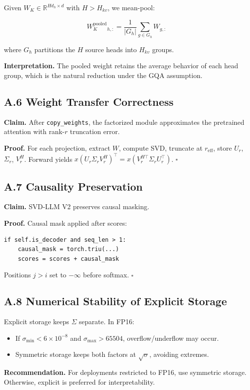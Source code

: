 Given $W_K \in \mathbb{R}^{H d_h \times d}$ with $H > H_{kv}$, we 
mean-pool:

\[
W_K^\text{pooled}_{h, :} = \frac{1}{|G_h|} \sum_{g \in G_h} W_{g, :}
\tag{A.4}
\]

where $G_h$ partitions the $H$ source heads into $H_{kv}$ groups.

\textbf{Interpretation.} The pooled weight retains the average behavior of each 
head group, which is the natural reduction under the GQA assumption.

\subsection{A.6 Weight Transfer Correctness}

\textbf{Claim.} After \texttt{copy\_weights}, the factorized module approximates the 
pretrained attention with rank-$r$ truncation error.

\textbf{Proof.} For each projection, extract $W$, compute SVD, truncate at 
$r_\text{eff}$, store $U_r$, $\Sigma_r$, $V_r^H$. Forward yields 
$x (U_r \Sigma_r V_r^H)^\top = x (V_r^{H\top} \Sigma_r U_r^\top)$. $\square$

\subsection{A.7 Causality Preservation}

\textbf{Claim.} SVD-LLM V2 preserves causal masking.

\textbf{Proof.} Causal mask applied after scores:

\begin{lstlisting}
if self.is_decoder and seq_len > 1:
    causal_mask = torch.triu(...)
    scores = scores + causal_mask
\end{lstlisting}

Positions $j > i$ set to $-\infty$ before softmax. $\square$

\subsection{A.8 Numerical Stability of Explicit Storage}

Explicit storage keeps $\Sigma$ separate. In FP16:

\begin{itemize}
\item If $\sigma_\text{min} < 6 \times 10^{-8}$ and $\sigma_\text{max} > 65504$,
  overflow/underflow may occur.
\item Symmetric storage keeps both factors at $\sqrt{\sigma}$, avoiding
  extremes.

\end{itemize}
\textbf{Recommendation.} For deployments restricted to FP16, use symmetric 
storage. Otherwise, explicit is preferred for interpretability.

